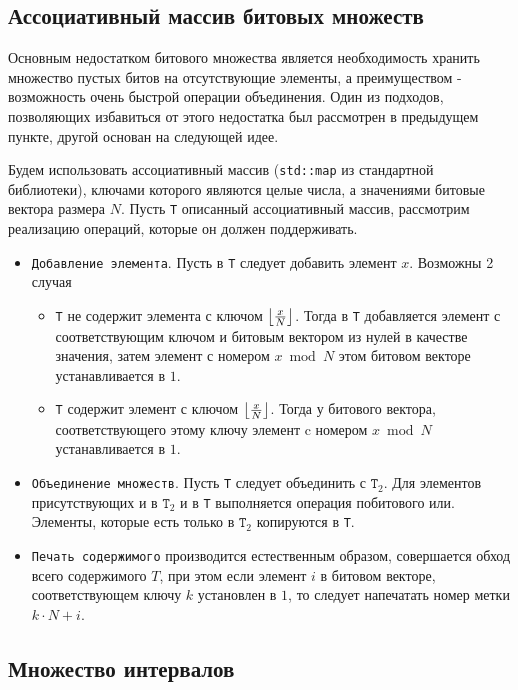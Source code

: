 \subsection{Ассоциативный массив битовых множеств}

Основным недостатком битового множества является необходимость хранить множество пустых битов на отсутствующие элементы, а преимуществом - возможность очень быстрой операции объединения. Один из подходов, позволяющих избавиться от этого недостатка был рассмотрен в предыдущем пункте, другой основан на следующей идее.

Будем использовать ассоциативный массив (\texttt{std::map} из стандартной библиотеки), ключами которого являются целые числа, а значениями битовые вектора размера $N$. Пусть \texttt{T} описанный ассоциативный массив, рассмотрим реализацию операций, которые он должен поддерживать.


\begin{itemize}
    \item \texttt{Добавление элемента}. Пусть в \texttt{T} следует добавить элемент $x$. Возможны 2 случая
    \begin{itemize}
        \item \texttt{T} не содержит элемента с ключом $\floor*{\frac{x}{N}}$. Тогда в \texttt{T} добавляется элемент с соответствующим ключом и битовым вектором из нулей в качестве значения, затем элемент с номером $x \bmod N$ этом битовом векторе устанавливается в $1$.
        \item \texttt{T} содержит элемент с ключом $\floor*{\frac{x}{N}}$. Тогда у битового вектора, соответствующего этому ключу элемент c номером $x \bmod N$ устанавливается в $1$.
    \end{itemize}
    \item \texttt{Объединение множеств}. Пусть \texttt{T} следует объединить с $\texttt{T}_2$. Для элементов присутствующих и в $\texttt{T}_2$ и в \texttt{T} выполняется операция побитового или. Элементы, которые есть только в $\texttt{T}_2$ копируются в \texttt{T}.
    \item \texttt{Печать содержимого} производится естественным образом, совершается обход всего содержимого $T$, при этом если элемент $i$ в битовом векторе, соответствующем ключу $k$ установлен в $1$, то следует напечатать номер метки $k \cdot N + i$.
\end{itemize}

\subsection{Множество интервалов}

